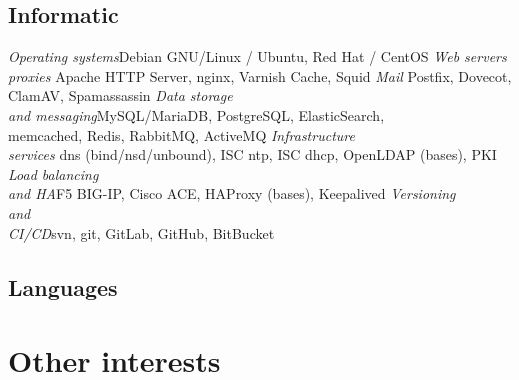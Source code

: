 \documentclass[10pt,a4paper]{moderncv}
\begin{document}
\subsection{Informatic}
{\textit{Operating systems}}{Debian GNU/Linux / Ubuntu, Red Hat / CentOS}
{\textit{Web servers\\proxies }}{Apache HTTP Server, nginx, Varnish Cache, Squid}
{\textit{Mail }}{Postfix, Dovecot, ClamAV, Spamassassin}
{\textit{Data storage\\and messaging}}{MySQL/MariaDB, PostgreSQL, ElasticSearch,\\ memcached, Redis, RabbitMQ, ActiveMQ}
{\textit{Infrastructure \\services }}{dns (bind/nsd/unbound), ISC ntp, ISC dhcp, OpenLDAP (bases), PKI}
{\textit{Load balancing \\and HA}}{F5 BIG-IP, Cisco ACE, HAProxy (bases), Keepalived}
{\textit{Versioning\\ and\\ CI/CD}}{svn, git, GitLab, GitHub, BitBucket}

\subsection{Languages}

\section{Other interests}
\end{document}
